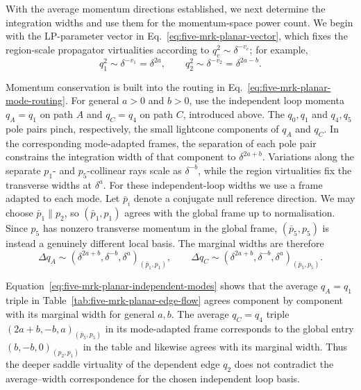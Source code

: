 \documentclass[a4paper,11pt]{article}
\begin{document}
With the average momentum directions established, we next determine the
integration widths and use them for the momentum-space power count.  We begin
with the LP-parameter vector in
Eq.~\eqref{eq:five-mrk-planar-vector}, which fixes the region-scale
propagator virtualities according to \(q_e^2\sim\delta^{-v_e}\); for example,
\begin{equation}
 q_1^2\sim\delta^{-v_1}=\delta^{2a},\qquad
 q_2^2\sim\delta^{-v_2}=\delta^{2a-b}.
 \label{eq:five-mrk-planar-q1-q2-virtualities}
\end{equation}
\begin{samepage}
Momentum conservation is built into the routing in
Eq.~\eqref{eq:five-mrk-planar-mode-routing}.  For general \(a>0\) and \(b>0\),
use the independent loop momenta \(q_A=q_1\) on path \(A\) and \(q_C=q_4\)
on path \(C\), introduced above.  The \(q_0,q_1\) and \(q_4,q_5\) pole pairs
pinch, respectively, the small lightcone components of \(q_A\) and \(q_C\).
In the corresponding mode-adapted frames, the separation of each pole pair
constrains the integration width of that component to
\(\delta^{2a+b}\).  Variations along the separate \(p_1\)- and
\(p_5\)-collinear rays scale as
\(\delta^{-b}\), while the region virtualities fix the transverse widths at
\(\delta^a\).  For these independent-loop widths we use a frame adapted to
each mode.  Let \(\bar p_i\) denote a conjugate null reference direction.
We may choose \(\bar p_1\parallel p_2\), so \((\bar p_1,p_1)\) agrees with the
global frame up to normalisation.  Since \(p_5\) has nonzero transverse
momentum in the global frame, \((\bar p_5,p_5)\) is instead a genuinely
different local basis.  The marginal widths are therefore
\begin{equation}
 \Delta q_A\sim
 (\delta^{2a+b},\delta^{-b},\delta^a)_{(\bar p_1,p_1)},\qquad
 \Delta q_C\sim
 (\delta^{2a+b},\delta^{-b},\delta^a)_{(\bar p_5,p_5)}.
 \label{eq:five-mrk-planar-independent-modes}
\end{equation}
\end{samepage}
Equation~\eqref{eq:five-mrk-planar-independent-modes} shows that the average
\(q_A=q_1\) triple in Table~\ref{tab:five-mrk-planar-edge-flow} agrees
component by component with its marginal width for general \(a,b\).  The
average \(q_C=q_4\) triple
\((2a+b,-b,a)_{(\bar p_5,p_5)}\) in its mode-adapted frame corresponds to the
global entry \((b,-b,0)_{(p_2,p_1)}\) in the table and likewise agrees with
its marginal width.  Thus the deeper saddle virtuality of the dependent edge
\(q_2\) does not contradict the average--width correspondence for the chosen
independent loop basis.
\end{document}
